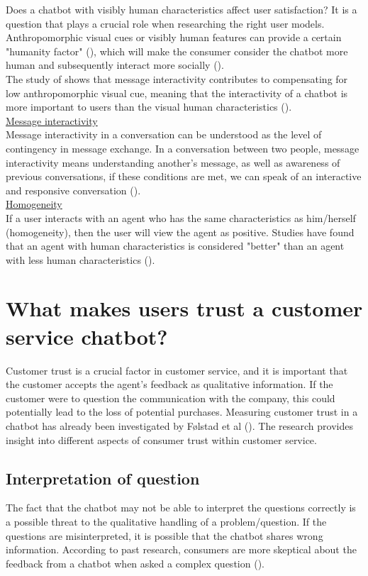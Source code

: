 Does a chatbot with visibly human characteristics affect user satisfaction? It is a question that plays a crucial role when researching the right user models. Anthropomorphic visual cues or visibly human features can provide a certain "humanity factor" (\cite{Shyam2008}), which will make the consumer consider the chatbot more human and subsequently interact more socially (\cite{Go2019,Gong2007,Kim2012, Nowak2004}).\\
\break
The study of \cite{Go2019} shows that message interactivity contributes to compensating for low anthropomorphic visual cue, meaning that the interactivity of a chatbot is more important to users than the visual human characteristics (\cite{Go2019}).\\
\break
\ul{Message interactivity}\\
Message interactivity in a conversation can be understood as the level of contingency in message exchange. In a conversation between two people, message interactivity means understanding another's message, as well as awareness of previous conversations, if these conditions are met, we can speak of an interactive and responsive conversation (\cite{Go2019,Sudweeks1998}).\\
\break
\ul{Homogeneity}\\
If a user interacts with an agent who has the same characteristics as him/herself (homogeneity), then the user will view the agent as positive. Studies have found that an agent with human characteristics is considered "better" than an agent with less human characteristics (\cite{Go2019,Koda1996,Wexelblat1998}). 

\section{What makes users trust a customer service chatbot?}
Customer trust is a crucial factor in customer service, and it is important that the customer accepts the agent's feedback as qualitative information. If the customer were to question the communication with the company, this could potentially lead to the loss of potential purchases. Measuring customer trust in a chatbot has already been investigated by Følstad et al (\cite{Folstad2018}). The research provides insight into different aspects of consumer trust within customer service.\\

\subsection{Interpretation of question}
The fact that the chatbot may not be able to interpret the questions correctly is a possible threat to the qualitative handling of a problem/question. If the questions are misinterpreted, it is possible that the chatbot shares wrong information. According to past research, consumers are more skeptical about the feedback from a chatbot when asked a complex question (\cite{Folstad2018,Nordheim2019}).\\

